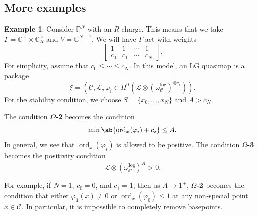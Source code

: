 \documentclass[10pt]{amsart}
\theoremstyle{definition}
\newtheorem{exm}[thm]{Example}
\theoremstyle{remark}
\theoremstyle{plain}
\theoremstyle{definition}
\theoremstyle{remark}
\newcommand{\C}{\mathbb{C}}
\renewcommand{\P}{\mathbb{P}}
\newcommand{\mc}[1]{\mathcal{#1}}
\newcommand{\on}[1]{\operatorname{#1}}
\newcommand{\1}{\mathbf{1}}
\newcommand{\2}{\mathbf{2}}
\newcommand{\3}{\mathbf{3}}
\begin{document}
\subsection{More examples}%
\label{sub:More examples}

\begin{exm}
    Consider $\P^N$ with an $R$-charge. This means that we take $\Gamma = \C^{\times} \times \C^{\times}_R$ and $V = \C^{N+1}$. We will have $\Gamma$ act with weights
    \[ \begin{bmatrix}
        1 & 1 & \cdots & 1 \\
        c_0 & c_1 & \cdots & c_N
    \end{bmatrix}. \]
    For simplicity, assume that $c_0 \leq \cdots \leq c_N$.
    In this model, an LG quasimap is a package
    \[ \xi = (\mc{C}, \mc{L}, \varphi_i \in H^0(\mc{L} \otimes ( \omega_{\mc{C}}^{\log} )^{\otimes c_i})). \]
    For the stability condition, we choose $S = \{x_0, \ldots, x_N \}$ and $A > c_N$.

    The condition \textbf{$\Omega$-2} becomes the condition
    \[ \min \ab\{ \on{ord}_x(\varphi_i) + c_i \} \leq A. \]
    In general, we see that $\on{ord}_x(\varphi_i)$ is allowed to be positive. The condition \textbf{$\Omega$-3} becomes the positivity condition
    \[ \mc{L} \otimes (\omega_{\mc{C}}^{\log})^A > 0. \]

    For example, if $N = 1$, $c_0 = 0$, and $c_1 = 1$, then as $A \to 1^+$, \textbf{$\Omega$-2} becomes the condition that either $\varphi_1(x) \neq 0$ or $\on{ord}_x ( \varphi_0 ) \leq 1$ at any non-special point $x \in \mc{C}$. In particular, it is impossible to completely remove basepoints.
\end{exm}
\end{document}
